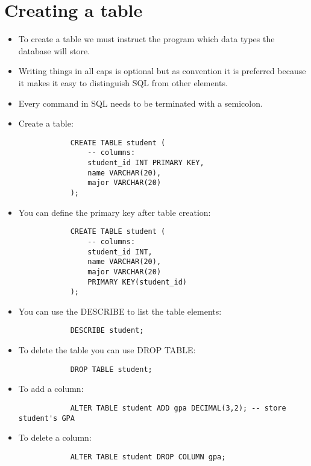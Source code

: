 \section{Creating a table}
\begin{itemize}
    \item To create a table we must instruct the program which data types the database will store.
    \item Writing things in all caps is optional but as convention it is preferred because it makes it easy to distinguish SQL from other elements.
    \item Every command in SQL needs to be terminated with a semicolon.
    \item Create a table:
        \begin{verbatim}
            CREATE TABLE student (
                -- columns:
                student_id INT PRIMARY KEY,
                name VARCHAR(20),
                major VARCHAR(20)
            );
        \end{verbatim}
    
    \item You can define the primary key after table creation:
        \begin{verbatim}
            CREATE TABLE student (
                -- columns:
                student_id INT,
                name VARCHAR(20),
                major VARCHAR(20)
                PRIMARY KEY(student_id)
            );
        \end{verbatim}
    
    \item You can use the DESCRIBE to list the table elements:
        \begin{verbatim}
            DESCRIBE student;
        \end{verbatim}
    
    \item To delete the table you can use DROP TABLE:
        \begin{verbatim}
            DROP TABLE student;
        \end{verbatim}
    
    \item To add a column:
        \begin{verbatim}
            ALTER TABLE student ADD gpa DECIMAL(3,2); -- store student's GPA
        \end{verbatim}
    
    \item To delete a column:
        \begin{verbatim}
            ALTER TABLE student DROP COLUMN gpa;
        \end{verbatim}
\end{itemize}
